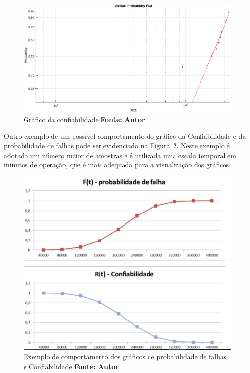 \graphicspath{{figuras/}}
\begin{figure}[H]
\centering
\includegraphics[width=1.0\textwidth]{grafico_confiabilidade.eps}
\caption{Gráfico da confiabilidade \textbf{Fonte: Autor}}
\label{grafico_confiabilidade}
\end{figure}

Outro exemplo de um possível comportamento do gráfico da Confiabilidade e da probabilidade de falhas pode ser evidenciado na Figura~\ref{graficos_probabilidade_faha_confiabilidade}. Neste exemplo é adotado um número maior de amostras e é utilizada uma escala temporal em minutos de operação, que é mais adequada para a visualização dos gráficos.

\graphicspath{{figuras/}}
\begin{figure}[H]
\centering
\includegraphics[width=1.0\textwidth]{graficos_probabilidade_de_falhas_e_confiabilidade.eps}
\caption{Exemplo de comportamento dos gráficos de probabilidade de falhas e Confiabilidade \textbf{Fonte: Autor}}
\label{graficos_probabilidade_faha_confiabilidade}
\end{figure}



